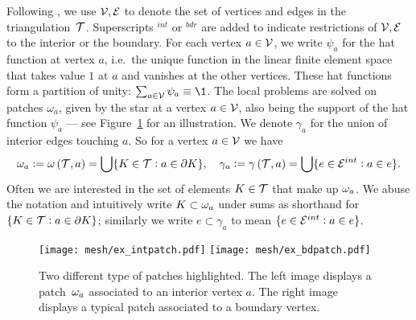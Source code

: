 \documentclass[thesis.tex]{subfiles}
\begin{document}
Following \cite{ernequil}, we use $\mathcal{V}, \mathcal{E}$ to denote  the set of vertices and edges in the triangulation~$\mathcal{T}$. 
Superscripts  $^{int}$ or $^{bdr}$ are added to indicate restrictions of $\mathcal{V}, \mathcal{E}$ to the interior or the boundary.
For each vertex $a \in \mathcal{V}$, we write $\psi_a$ for the hat function at vertex $a$, 
i.e.~the unique function in the linear finite element space
that takes value $1$ at $a$ and vanishes at the other vertices.
These hat functions form a partition of unity: $\sum_{a \in \V} \psi_a \equiv \1$.
The local problems are solved on patches $\omega_a$, given by the star at a vertex $a \in \mathcal{V}$, also being the support of
the hat function $\psi_a$ --- see Figure~\ref{fig:patches} for an illustration. We denote $\gamma_a$ for the union of interior edges touching $a$. 
So for a vertex $a \in \mathcal{V}$ we have
\[
  \omega_a       := \omega\left(\mathcal{T}, a\right) = \bigcup \{ K \in \mathcal{T} : a \in \partial K\},
  \quad \gamma_a := \gamma\left(\mathcal{T}, a\right) = \bigcup \{ e \in \mathcal{E}^{int} : a \in e\}.
\]
Often we are interested in the set of elements $K \in \mathcal{T}$ that make up $\omega_a$. We abuse the notation and intuitively write $K \subset \omega_a$
under sums as shorthand for $\set{K \in \mathcal{T}: a \in \partial K}$; similarly we write $e \subset \gamma_a$ to mean $\{e \in \mathcal{E}^{int} : a\in e\}$.
 
\begin{figure}
  \centering
  \texttt{[image: mesh/ex\_intpatch.pdf]}
  \quad
  \texttt{[image: mesh/ex\_bdpatch.pdf]}
  \caption{Two different type of patches highlighted. The left image displays a patch~$\omega_a$  associated to an interior vertex $a$.
  The right image displays a typical patch associated to a boundary vertex.}
  \label{fig:patches}
\end{figure}
  
\end{document}

